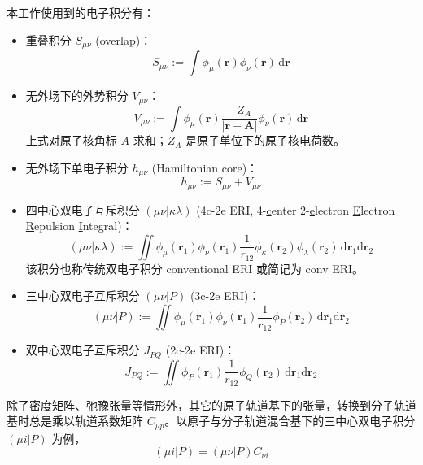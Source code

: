 本工作使用到的电子积分有：
\begin{itemize}[nosep]
  \item 重叠积分 $S_{\mu \nu}$ (overlap)：
        \begin{equation}
          S_{\mu \nu} := \int \phi_\mu (\bm{r}) \phi_\nu (\bm{r}) \, \mathrm{d} \bm{r}
        \end{equation}
  \item 无外场下的外势积分 $V_{\mu \nu}$：
        \begin{equation}
          V_{\mu \nu} := \int \phi_\mu (\bm{r}) \frac{- Z_A}{|\bm{r} - \bm{A}|} \phi_\nu (\bm{r}) \, \mathrm{d} \bm{r}
        \end{equation}
        上式对原子核角标 $A$ 求和；$Z_A$ 是原子单位下的原子核电荷数。
  \item 无外场下单电子积分 $h_{\mu \nu}$ (Hamiltonian core)：
        \begin{equation}
          h_{\mu \nu} := S_{\mu \nu} + V_{\mu \nu}
        \end{equation}
  \item 四中心双电子互斥积分 $(\mu \nu | \kappa \lambda)$ (4c-2e ERI, 4-\underline{c}enter 2-\underline{e}lectron \underline{E}lectron \underline{R}epulsion \underline{I}ntegral)：
        \begin{equation}
          (\mu \nu | \kappa \lambda) := \iint \phi_\mu (\bm{r}_1) \phi_\nu (\bm{r}_1) \frac{1}{r_{12}} \phi_\kappa (\bm{r}_2) \phi_\lambda (\bm{r}_2) \, \mathrm{d} \bm{r}_1 \mathrm{d} \bm{r}_2
        \end{equation}
        该积分也称传统双电子积分 conventional ERI 或简记为 conv ERI。
  \item 三中心双电子互斥积分 $(\mu \nu | P)$ (3c-2e ERI)：
        \begin{equation}
          (\mu \nu | P) := \iint \phi_\mu (\bm{r}_1) \phi_\nu (\bm{r}_1) \frac{1}{r_{12}} \phi_P (\bm{r}_2) \, \mathrm{d} \bm{r}_1 \mathrm{d} \bm{r}_2
        \end{equation}
  \item 双中心双电子互斥积分 $J_{PQ}$ (2c-2e ERI)：
        \begin{equation}
          J_{PQ} := \iint \phi_P (\bm{r}_1) \frac{1}{r_{12}} \phi_Q (\bm{r}_2) \, \mathrm{d} \bm{r}_1 \mathrm{d} \bm{r}_2
        \end{equation}
\end{itemize}

除了密度矩阵、弛豫张量等情形外，其它的原子轨道基下的张量，转换到分子轨道基时总是乘以轨道系数矩阵 $C_{\mu p}$。以原子与分子轨道混合基下的三中心双电子积分 $(\mu i | P)$ 为例，
\begin{equation*}
  (\mu i | P) = (\mu \nu | P) C_{\nu i}
\end{equation*}

